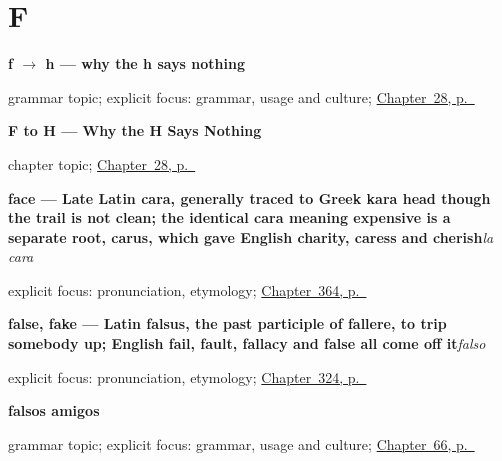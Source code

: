 \section*{F}

\noindent\begin{minipage}[t]{\linewidth}
\raggedright
\textbf{f $\to$ h — why the h says nothing}\par
\footnotesize grammar topic; explicit focus: grammar, usage and culture; \hyperref[ch:sound-f-h]{Chapter~28, p.~\pageref*{ch:sound-f-h}}
\end{minipage}\par\smallskip

\noindent\begin{minipage}[t]{\linewidth}
\raggedright
\textbf{F to H --- Why the H Says Nothing}\par
\footnotesize chapter topic; \hyperref[ch:sound-f-h]{Chapter~28, p.~\pageref*{ch:sound-f-h}}
\end{minipage}\par\smallskip

\noindent\begin{minipage}[t]{\linewidth}
\raggedright
\textbf{face — Late Latin cara, generally traced to Greek kara head though the trail is not clean; the identical cara meaning expensive is a separate root, carus, which gave English charity, caress and cherish}\enspace\emph{la cara}\par
\footnotesize explicit focus: pronunciation, etymology; \hyperref[ch:la-mujer-y-la-cara]{Chapter~364, p.~\pageref*{ch:la-mujer-y-la-cara}}
\end{minipage}\par\smallskip

\noindent\begin{minipage}[t]{\linewidth}
\raggedright
\textbf{false, fake — Latin falsus, the past participle of fallere, to trip somebody up; English fail, fault, fallacy and false all come off it}\enspace\emph{falso}\par
\footnotesize explicit focus: pronunciation, etymology; \hyperref[ch:verdad-y-siquiera]{Chapter~324, p.~\pageref*{ch:verdad-y-siquiera}}
\end{minipage}\par\smallskip

\noindent\begin{minipage}[t]{\linewidth}
\raggedright
\textbf{falsos amigos}\par
\footnotesize grammar topic; explicit focus: grammar, usage and culture; \hyperref[ch:falsos-amigos]{Chapter~66, p.~\pageref*{ch:falsos-amigos}}
\end{minipage}\par\smallskip

